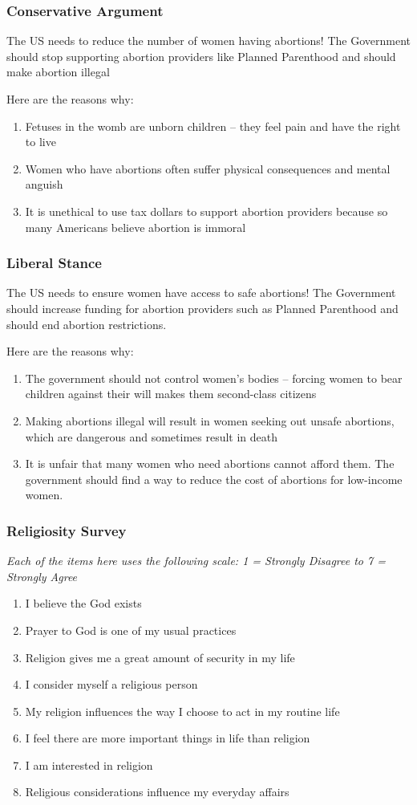 \documentclass[14pt]{beamer}
\newcommand\e{\emph}
\begin{document}
\begin{frame}
\frametitle{Conservative Argument}
\small
The US needs to reduce the number of women having abortions! The Government should stop supporting abortion providers like Planned Parenthood and should make abortion illegal

Here are the reasons why:
\begin{enumerate}
	\item Fetuses in the womb are unborn children – they feel pain and have the right to live
	\item	Women who have abortions often suffer physical consequences and mental anguish
	\item	It is unethical to use tax dollars to support abortion providers because so many Americans believe abortion is immoral
\end{enumerate}
\end{frame}

\begin{frame}
\frametitle{Liberal Stance}
\small
The US needs to ensure women have access to safe abortions! The Government should increase funding for abortion providers such as Planned Parenthood and should end abortion restrictions.

Here are the reasons why:
\begin{enumerate}
	\item  The government should not control women’s bodies – forcing women to bear children against their will makes them second-class citizens
	\item Making abortions illegal will result in women seeking out unsafe abortions, which are dangerous and sometimes result in death
	\item It is unfair that many women who need abortions cannot afford them. The government should find a way to reduce the cost of abortions for low-income women.
\end{enumerate}
\end{frame}

\begin{frame}
\frametitle{Religiosity Survey}
\footnotesize
\begin{center}
	\e{Each of the items here uses the following scale: 1 = Strongly Disagree to 7 = Strongly Agree}
\end{center}

\begin{enumerate}
	\item I believe the God exists
	\item Prayer to God is one of my usual practices
	\item Religion gives me a great amount of security in my life
	\item I consider myself a religious person
	\item My religion influences the way I choose to act in my routine life
	\item I feel there are more important things in life than religion
	\item I am interested in religion 
	\item Religious considerations influence my everyday affairs
\end{enumerate}
\end{frame}
\end{document}

